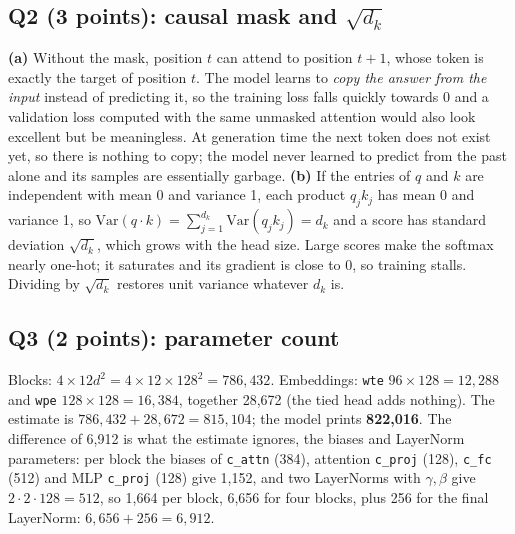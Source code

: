 \documentclass[10pt,twocolumn]{article}
\begin{document}
\subsection*{Q2 (3 points): causal mask and $\sqrt{d_k}$}
\textbf{(a)} Without the mask, position $t$ can attend to position $t+1$, whose token is exactly the target of position $t$. The model learns to \emph{copy the answer from the input} instead of predicting it, so the training loss falls quickly towards 0 and a validation loss computed with the same unmasked attention would also look excellent but be meaningless. At generation time the next token does not exist yet, so there is nothing to copy; the model never learned to predict from the past alone and its samples are essentially garbage. \textbf{(b)} If the entries of $q$ and $k$ are independent with mean 0 and variance 1, each product $q_jk_j$ has mean 0 and variance 1, so $\mathrm{Var}(q\cdot k)=\sum_{j=1}^{d_k}\mathrm{Var}(q_jk_j)=d_k$ and a score has standard deviation $\sqrt{d_k}$, which grows with the head size. Large scores make the softmax nearly one-hot; it saturates and its gradient is close to 0, so training stalls. Dividing by $\sqrt{d_k}$ restores unit variance whatever $d_k$ is.

\subsection*{Q3 (2 points): parameter count}
Blocks: $4\times12d^2=4\times12\times128^2=786{,}432$. Embeddings: \texttt{wte} $96\times128=12{,}288$ and \texttt{wpe} $128\times128=16{,}384$, together 28,672 (the tied head adds nothing). The estimate is $786{,}432+28{,}672=815{,}104$; the model prints \textbf{822,016}. The difference of 6,912 is what the estimate ignores, the biases and LayerNorm parameters: per block the biases of \texttt{c\_attn} (384), attention \texttt{c\_proj} (128), \texttt{c\_fc} (512) and MLP \texttt{c\_proj} (128) give 1,152, and two LayerNorms with $\gamma,\beta$ give $2\cdot2\cdot128=512$, so 1,664 per block, 6,656 for four blocks, plus 256 for the final LayerNorm: $6{,}656+256=6{,}912$.
\end{document}
